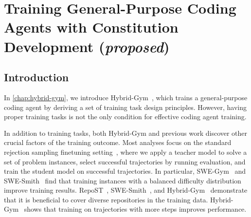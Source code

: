 \chapter{Training General-Purpose Coding Agents with Constitution Development (\textit{proposed})}
\label{chap:effective-analysis}



\begin{table}[t]
\centering
\small
{}
\caption{Results on training Qwen2.5Coder-7B on successful trajectories of the exact same 399 function localization instances generated by Qwen2.5Coder-32B and Claude-3.7. 
We evaluate the models on a subset of the SWE-bench Verified issue-solving dataset after training. 
}
\label{ablation:self-vs-claude}
\end{table}


\section{Introduction}

In \autoref{chap:hybrid-gym}, we introduce Hybrid-Gym~\cite{hybrid-gym}, which trains a general-purpose coding agent by deriving a set of training task design principles. 
However, having proper training tasks is not the only condition for effective coding agent training.

In addition to training tasks, both Hybrid-Gym and previous work discover other crucial factors of the training outcome.
Most analyses focus on the standard rejection sampling finetuning setting~\cite{rejection-sampling}, where we apply a teacher model to solve a set of problem instances, select successful trajectories by running evaluation, and train the student model on successful trajectories.
In particular, SWE-Gym~\cite{swegym} and SWE-Smith~\cite{swe-smith} find that training instances with a balanced difficulty distribution improve training results.
RepoST~\cite{repost}, SWE-Smith~\cite{swe-smith}, and Hybrid-Gym~\cite{hybrid-gym} demonstrate that it is beneficial to cover diverse repositories in the training data.
Hybrid-Gym~\cite{hybrid-gym} shows that training on trajectories with more steps improves performance.

